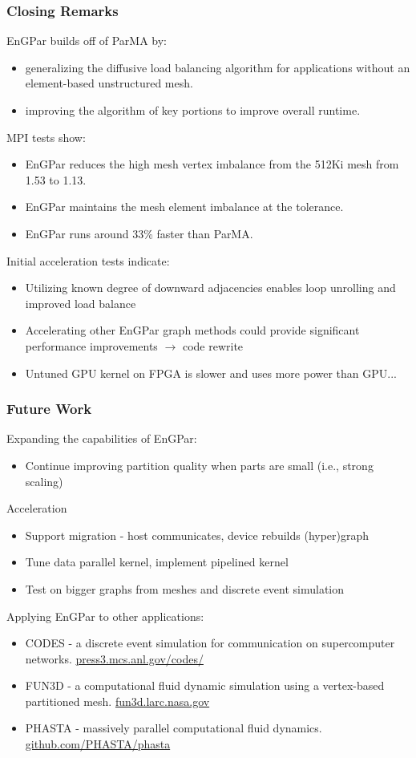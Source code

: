 \documentclass{beamer}
\begin{document}
\begin{frame}
  \frametitle{Closing Remarks}
  EnGPar builds off of ParMA by:
  \begin {itemize}
  \item generalizing the diffusive load balancing algorithm for applications without an element-based unstructured mesh.
  \item improving the algorithm of key portions to improve overall runtime.
  \end{itemize}
  MPI tests show:
  \begin {itemize}
  \item EnGPar reduces the high mesh vertex imbalance from the 512Ki mesh from 1.53 to 1.13.
  \item EnGPar maintains the mesh element imbalance at the tolerance.
  \item EnGPar runs around 33\% faster than ParMA.
  \end{itemize}
  Initial acceleration tests indicate:
  \begin {itemize}
  \item Utilizing known degree of downward adjacencies enables
    loop unrolling and improved load balance
  \item Accelerating other EnGPar graph methods could provide significant performance
    improvements $\rightarrow$ code rewrite
  \item Untuned GPU kernel on FPGA is slower and uses more power than GPU...
  \end{itemize}
\end{frame}

\begin{frame}
  \frametitle{Future Work}
  Expanding the capabilities of EnGPar:
  \begin{itemize}
    \item Continue improving partition quality when parts are small (i.e., strong scaling)
  \end{itemize}
  Acceleration
  \begin{itemize}
    \item Support migration - host communicates, device rebuilds (hyper)graph
    \item Tune data parallel kernel, implement pipelined kernel
    \item Test on bigger graphs from meshes and discrete event simulation
  \end{itemize}
  Applying EnGPar to other applications:
  \begin{itemize}
    \item CODES - a discrete event simulation for communication on supercomputer networks. \url{press3.mcs.anl.gov/codes/}
    \item FUN3D - a computational fluid dynamic simulation using a vertex-based partitioned mesh. \url{fun3d.larc.nasa.gov}
    \item PHASTA - massively parallel computational fluid dynamics. \url{github.com/PHASTA/phasta}
  \end{itemize}
\end{frame}
\end{document}
